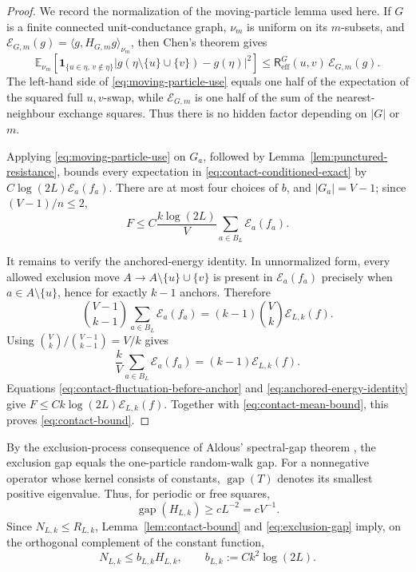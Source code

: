 \documentclass[11pt]{article}
\numberwithin{equation}{section}
\theoremstyle{remark}
\newcommand{\1}{\mathbf 1}
\newcommand{\cE}{\mathcal E}
\newcommand{\gap}{\operatorname{gap}}
\begin{document}
\begin{proof}
We record the normalization of the moving-particle lemma used here.  If
\(G\) is a finite connected unit-conductance graph, \(\nu_m\) is uniform
on its \(m\)-subsets, and
\(\cE_{G,m}(g)=\langle g,H_{G,m}g\rangle_{\nu_m}\), then Chen's theorem
\cite{Chen2017} gives
\begin{equation}
 \mathbb E_{\nu_m}\left[
 \1_{\{u\in\eta,\,v\notin\eta\}}
 |g(\eta\setminus\{u\}\cup\{v\})-g(\eta)|^2\right]
 \leq \mathsf R_{\mathrm{eff}}^G(u,v)\,\cE_{G,m}(g).
 \label{eq:moving-particle-use}
\end{equation}
The left-hand side of \eqref{eq:moving-particle-use} equals one half of the
expectation of the squared full \(u,v\)-swap, while \(\cE_{G,m}\) is one
half of the sum of the
nearest-neighbour exchange squares.  Thus there is no hidden factor
depending on \(|G|\) or \(m\).

Applying \eqref{eq:moving-particle-use} on \(G_a\), followed by
Lemma~\ref{lem:punctured-resistance}, bounds every expectation in
\eqref{eq:contact-conditioned-exact} by
\(C\log(2L)\cE_a(f_a)\).  There are at most four choices of \(b\), and
\(|G_a|=V-1\); since \((V-1)/n\leq2\),
\begin{equation}
 F\leq C\frac{k\log(2L)}V\sum_{a\in B_L}\cE_a(f_a).
 \label{eq:contact-fluctuation-before-anchor}
\end{equation}

It remains to verify the anchored-energy identity.  In unnormalized form,
every allowed exclusion move \(A\to A\setminus\{u\}\cup\{v\}\) is
present in \(\cE_a(f_a)\) precisely when
\(a\in A\setminus\{u\}\), hence for exactly \(k-1\) anchors.  Therefore
\[
 \binom{V-1}{k-1}\sum_{a\in B_L}\cE_a(f_a)
 =(k-1)\binom Vk\cE_{L,k}(f).
\]
Using \(\binom Vk/\binom{V-1}{k-1}=V/k\) gives
\begin{equation}
 \frac{k}{V}\sum_{a\in B_L}\cE_a(f_a)
 =(k-1)\cE_{L,k}(f).
 \label{eq:anchored-energy-identity}
\end{equation}
Equations \eqref{eq:contact-fluctuation-before-anchor} and
\eqref{eq:anchored-energy-identity} give
\(F\leq Ck\log(2L)\cE_{L,k}(f)\).  Together with
\eqref{eq:contact-mean-bound}, this proves \eqref{eq:contact-bound}.
\end{proof}

By the exclusion-process consequence of Aldous' spectral-gap theorem
\cite{CaputoLiggettRichthammer2010}, the
exclusion gap equals the one-particle random-walk gap.  For a nonnegative
operator whose kernel
consists of constants, \(\gap(T)\) denotes its smallest positive
eigenvalue.  Thus, for periodic or free squares,
\begin{equation}
 \gap(H_{L,k})\geq cL^{-2}=cV^{-1}.
 \label{eq:exclusion-gap}
\end{equation}
Since \(N_{L,k}\leq R_{L,k}\), Lemma~\ref{lem:contact-bound} and
\eqref{eq:exclusion-gap} imply, on the orthogonal complement of the
constant function,
\begin{equation}
 N_{L,k}\leq b_{L,k}H_{L,k},
 \qquad b_{L,k}:=Ck^2\log(2L).
 \label{eq:first-order-N-bound}
\end{equation}
\end{document}
